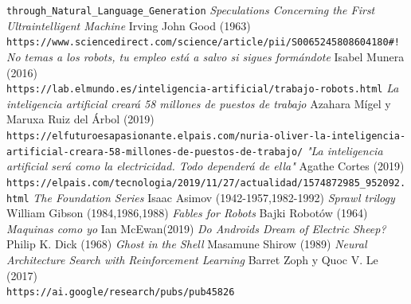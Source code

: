\documentclass[12pt,a4paper]{article}
\begin{document}
\begin{thebibliography}{9}
\texttt{through\_Natural\_Language\_Generation}
 \textit{Speculations Concerning the First Ultraintelligent Machine} Irving John Good (1963)
\\\texttt{https://www.sciencedirect.com/science/article/pii/S0065245808604180\#!}
 \textit{No temas a los robots, tu empleo está a salvo si sigues formándote} Isabel Munera (2016)
\\\texttt{https://lab.elmundo.es/inteligencia-artificial/trabajo-robots.html}
 \textit{La inteligencia artificial creará 58 millones de puestos de trabajo} Azahara Mígel y Maruxa Ruiz del Árbol (2019)
\\\texttt{https://elfuturoesapasionante.elpais.com/nuria-oliver-la-inteligencia-}
\\\texttt{artificial-creara-58-millones-de-puestos-de-trabajo/}
 \textit{"La inteligencia artificial será como la electricidad. Todo dependerá de ella"} Agathe Cortes (2019)
\\\texttt{https://elpais.com/tecnologia/2019/11/27/actualidad/1574872985\_952092.html}
 \textit{The Foundation Series} Isaac Asimov (1942-1957,1982-1992)
 \textit{Sprawl trilogy} William Gibson (1984,1986,1988)
 \textit{Fables for Robots} Bajki Robotów (1964)
 \textit{Maquinas como yo} Ian McEwan(2019)
 \textit{Do Androids Dream of Electric Sheep?} Philip K. Dick (1968)
 \textit{Ghost in the Shell} Masamune Shirow (1989)
 \textit{Neural Architecture Search with Reinforcement Learning} Barret Zoph y Quoc V. Le (2017)
\\\texttt{https://ai.google/research/pubs/pub45826}
\end{thebibliography}
\end{document}
